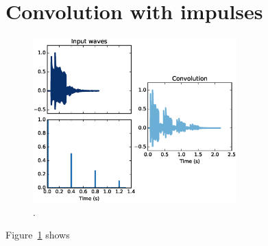 \documentclass[12pt]{book}
\begin{document}
\section{Convolution with impulses}

\begin{figure}
\centerline{\includegraphics[height=2.5in]{figs/sampling1.eps}}
\caption{.}
\label{fig.sampling1}
\end{figure}

Figure~\ref{fig.sampling1} shows 
\end{document}
